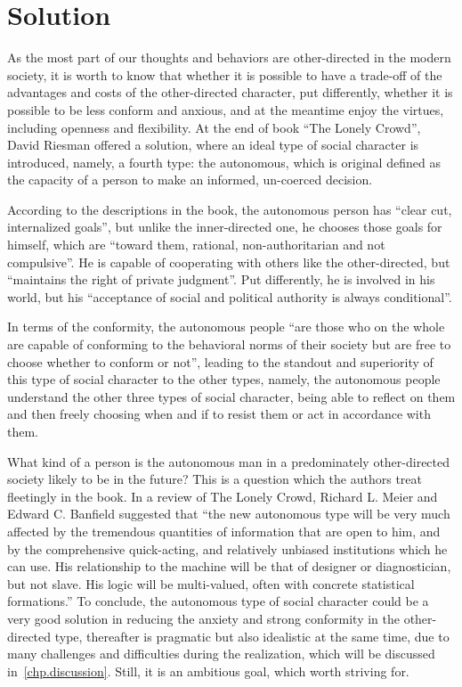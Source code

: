 \chapter{Solution}\label{chp.solution}

As the most part of our thoughts and behaviors are other-directed in the modern society, it is worth to know that whether it is possible to have a trade-off of the advantages and costs of the other-directed character, put differently, whether it is possible to be less conform and anxious, and at the meantime enjoy the virtues, including openness and flexibility. At the end of book ``The Lonely Crowd'', David Riesman offered a solution, where an ideal type of social character is introduced, namely, a fourth type: the autonomous, which is original defined as the capacity of a person to make an informed, un-coerced decision.

According to the descriptions in the book, the autonomous person has ``clear cut, internalized goals'', but unlike the inner-directed one, he chooses those goals for himself, which are ``toward them, rational, non-authoritarian and not compulsive''. He is capable of cooperating with others like the other-directed, but ``maintains the right of private judgment''. Put differently, he is involved in his world, but his ``acceptance of social and political authority is always conditional''.

In terms of the conformity, the autonomous people ``are those who on the whole are capable of conforming to the behavioral norms of their society but are free to choose whether to conform or not'', leading to the standout and superiority of this type of social character to the other types, namely, the autonomous people understand the other three types of social character, being able to reflect on them and then freely choosing when and if to resist them or act in accordance with them. 

What kind of a person is the autonomous man in a predominately other-directed society likely to be in the future? This is a question which the authors treat fleetingly in the book. In a review of The Lonely Crowd, Richard L. Meier and Edward C. Banfield suggested that ``the new autonomous type will be very much affected by the tremendous quantities of information that are open to him, and by the comprehensive quick-acting, and relatively unbiased institutions which he can use. His relationship to the machine will be that of designer or diagnostician, but not slave. His logic will be multi-valued, often with concrete statistical formations.'' To conclude, the autonomous type of social character could be a very good solution in reducing the anxiety and strong conformity in the other-directed type, thereafter is pragmatic but also idealistic at the same time, due to many challenges and difficulties during the realization, which will be discussed in~\ref{chp.discussion}. Still, it is an ambitious goal, which worth striving for.




